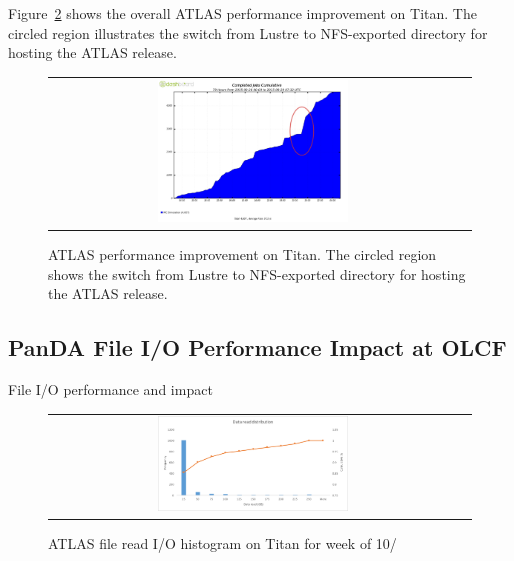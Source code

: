 Figure~\ref{fig:atlas-perf-improvement} shows the overall ATLAS performance
improvement on Titan. The circled region illustrates the switch from Lustre to
NFS-exported directory for hosting the ATLAS release.

\begin{figure}[!htb]
    \centering
    \begin{tabular}{cc}
        {\includegraphics[width=0.48\textwidth]{figures/panda-completed-jobs-sw-move.pdf}}\\
    \end{tabular}
    \caption{ATLAS performance improvement on Titan. The circled region shows the switch from Lustre to NFS-exported directory for hosting the ATLAS release.}
    \label{fig:atlas-perf-improvement}
\end{figure}



\subsection{PanDA File I/O Performance Impact at OLCF}

File I/O performance and impact


\begin{figure}[!htb]
    \centering
    \begin{tabular}{cc}
        {\includegraphics[width=0.48\textwidth]{figures/panda_data_read_hist.pdf}}\\
    \end{tabular}
    \caption{ATLAS file read I/O histogram on Titan for week of 10/}
    \label{fig:atlas-perf-improvement}
\end{figure}



